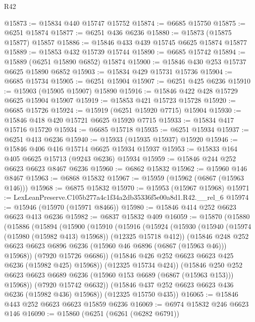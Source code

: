 \begin{lexlean}{R42}
\begin{coremodule}
{@15873 := @15834 @440 @15747 @15752
@15874 := @6685 @15750
@15875 := @6251 @15874
@15877 := @6251 @436 @6236
@15880 := @15873 (@15875 @15877) @15857
@15886 := @15846 @433 @439 @15745 @6625 @15874 @15877
@15889 := @15853 @432 @15739 @15744
@15890 := @6685 @15742
@15894 := @15889 (@6251 @15890 @6852) @15874
@15900 := @15846 @430 @253 @15737 @6625 @15890 @6852
@15903 := @15834 @429 @15731 @15736
@15904 := @6685 @15734
@15905 := @6251 @15904
@15907 := @6251 @425 @6236
@15910 := @15903 (@15905 @15907) @15890
@15916 := @15846 @422 @428 @15729 @6625 @15904 @15907
@15919 := @15853 @421 @15723 @15728
@15920 := @6685 @15726
@15924 := @15919 (@6251 @15920 @7715) @15904
@15930 := @15846 @418 @420 @15721 @6625 @15920 @7715
@15933 := @15834 @417 @15716 @15720
@15934 := @6685 @15718
@15935 := @6251 @15934
@15937 := @6251 @413 @6236
@15940 := @15933 (@15935 @15937) @15920
@15946 := @15846 @406 @416 @15714 @6625 @15934 @15937
@15953 := @15833 @164 @405 @6625 @15713 (@9243 @6236) @15934
@15959 := @15846 @244 @252 @6623 @6623 @8467 @6236
@15960 := @6862 @15832
@15962 := @15960 @146 @8467
@15963 := @6868 @15832
@15967 := @15959 (@15962 (@6867 (@15963 @146)))
@15968 := @6875 @15832
@15970 := @15953 (@15967 @15968)
@15971 := LexLeanPreserve.C105b277a4c1f34a2db35336f5e00a8d1.R42.__rel_6
@15974 := @15946 (@15970 (@15971 @8466))
@15980 := @15846 @414 @252 @6623 @6623 @413 @6236
@15982 := @6837 @15832 @409
@16059 := @15870
    (@15880
      (@15886
        (@15894
          (@15900
            (@15910
              (@15916
                (@15924
                  (@15930
                    (@15940 (@15974 (@15980 (@15982 @413) @15968)) (@12325 @15718 @412))
                    (@15846
                      @248
                      @252
                      @6623
                      @6623
                      @6896
                      @6236
                      (@15960 @46 @6896 (@6867 (@15963 @46)))
                      @15968))
                  (@7920 @15726 @6686))
                (@15846 @426 @252 @6623 @6623 @425 @6236 (@15982 @425) @15968))
              (@12325 @15734 @424))
            (@15846
              @250
              @252
              @6623
              @6623
              @6689
              @6236
              (@15960 @153 @6689 (@6867 (@15963 @153)))
              @15968))
          (@7920 @15742 @6632))
        (@15846 @437 @252 @6623 @6623 @436 @6236 (@15982 @436) @15968))
      (@12325 @15750 @435))
@16065 := @15846 @443 @252 @6623 @6623 @15859 @6236
@16069 := @6974 @15832 @246 @6623 @146
@16090 := @15860
    (@6251
      (@6261 (@6282 @6791))
}
\end{coremodule}
\end{lexlean}
